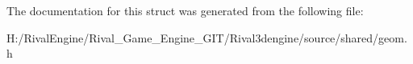 The documentation for this struct was generated from the following file\+:\begin{DoxyCompactItemize}
\item 
H\+:/\+Rival\+Engine/\+Rival\+\_\+\+Game\+\_\+\+Engine\+\_\+\+G\+I\+T/\+Rival3dengine/source/shared/geom.\+h\end{DoxyCompactItemize}
